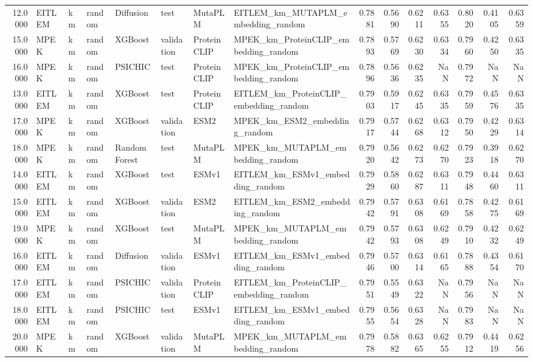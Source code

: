 \begin{tabular}{rlllllllrrrrrrr}
12.0000 & EITLEM & km & random & Diffusion & test & MutaPLM & EITLEM_km_MUTAPLM_embedding_random & 0.7881 & 0.5690 & 0.6211 & 0.6355 & 0.8020 & 0.4105 & 0.6359 \\
15.0000 & MPEK & km & random & XGBoost & validation & ProteinCLIP & MPEK_km_ProteinCLIP_embedding_random & 0.7893 & 0.5769 & 0.6230 & 0.6334 & 0.7960 & 0.4250 & 0.6335 \\
16.0000 & MPEK & km & random & PSICHIC & test & ProteinCLIP & MPEK_km_ProteinCLIP_embedding_random & 0.7896 & 0.5636 & 0.6235 & NaN & 0.7972 & NaN & NaN \\
13.0000 & EITLEM & km & random & XGBoost & test & ProteinCLIP & EITLEM_km_ProteinCLIP_embedding_random & 0.7903 & 0.5917 & 0.6245 & 0.6335 & 0.7959 & 0.4576 & 0.6335 \\
17.0000 & MPEK & km & random & XGBoost & validation & ESM2 & MPEK_km_ESM2_embedding_random & 0.7917 & 0.5744 & 0.6268 & 0.6312 & 0.7950 & 0.4229 & 0.6314 \\
18.0000 & MPEK & km & random & Random Forest & test & MutaPLM & MPEK_km_MUTAPLM_embedding_random & 0.7920 & 0.5642 & 0.6273 & 0.6270 & 0.7923 & 0.3918 & 0.6270 \\
14.0000 & EITLEM & km & random & XGBoost & test & ESMv1 & EITLEM_km_ESMv1_embedding_random & 0.7929 & 0.5860 & 0.6287 & 0.6311 & 0.7948 & 0.4460 & 0.6311 \\
15.0000 & EITLEM & km & random & XGBoost & validation & ESM2 & EITLEM_km_ESM2_embedding_random & 0.7942 & 0.5791 & 0.6308 & 0.6169 & 0.7858 & 0.4275 & 0.6169 \\
19.0000 & MPEK & km & random & XGBoost & test & MutaPLM & MPEK_km_MUTAPLM_embedding_random & 0.7942 & 0.5793 & 0.6308 & 0.6249 & 0.7910 & 0.4232 & 0.6249 \\
16.0000 & EITLEM & km & random & Diffusion & validation & ESMv1 & EITLEM_km_ESMv1_embedding_random & 0.7946 & 0.5700 & 0.6314 & 0.6165 & 0.7888 & 0.4354 & 0.6170 \\
17.0000 & EITLEM & km & random & PSICHIC & validation & ProteinCLIP & EITLEM_km_ProteinCLIP_embedding_random & 0.7951 & 0.5549 & 0.6322 & NaN & 0.7956 & NaN & NaN \\
18.0000 & EITLEM & km & random & PSICHIC & test & ESMv1 & EITLEM_km_ESMv1_embedding_random & 0.7955 & 0.5654 & 0.6328 & NaN & 0.7983 & NaN & NaN \\
20.0000 & MPEK & km & random & XGBoost & validation & MutaPLM & MPEK_km_MUTAPLM_embedding_random & 0.7978 & 0.5882 & 0.6365 & 0.6255 & 0.7912 & 0.4419 & 0.6256 \\

\end{tabular}
